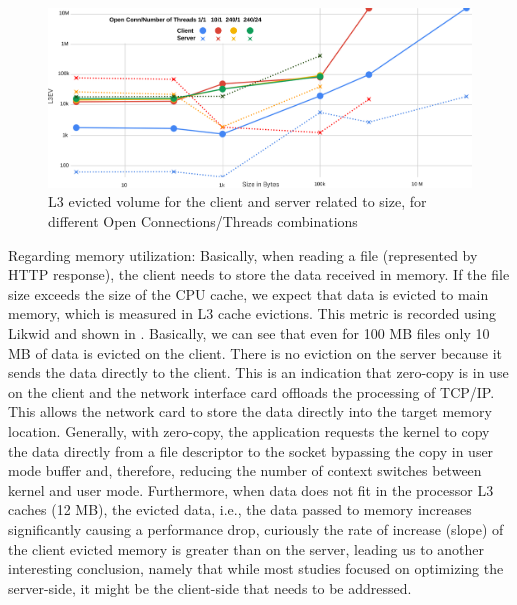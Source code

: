 \documentclass[runningheads]{llncs}
\begin{document}
\begin{figure}
\includegraphics[width=\textwidth]{l3ev-to-size.png}\vspace{-1em}
\caption{L3 evicted volume for the client and server related to size, for different Open Connections/Threads combinations}\vspace{-1.5em}
\label{fig:l3ev-to-size}
\end{figure}
Regarding memory utilization: Basically, when reading a file (represented by HTTP response), the client needs to store the data received in memory. If the file size exceeds the size of the CPU cache, we expect that data is evicted to main memory, which is measured in L3 cache evictions. This metric is recorded using Likwid and shown in . Basically, we can see that even for 100 MB files only 10 MB of data is evicted on the client. There is no eviction on the server because it sends the data directly to the client. This is an indication that zero-copy \cite{zerocopy} is in use on the client and the network interface card offloads the processing of TCP/IP. This allows  the network card to store the data directly into the target memory location. Generally, with zero-copy, the application requests the kernel to copy the data directly from a file descriptor to the socket bypassing the copy in user mode buffer and, therefore, reducing the number of context switches between kernel and user mode.
Furthermore, when data does not fit in the processor L3 caches (12 MB), the evicted data, i.e., the data passed to memory increases significantly causing a performance drop, curiously the rate of increase (slope) of the client evicted memory is greater than on the server, leading us to another interesting conclusion, namely that while most studies focused on optimizing the server-side, it might be the client-side that needs to be addressed.
\end{document}
